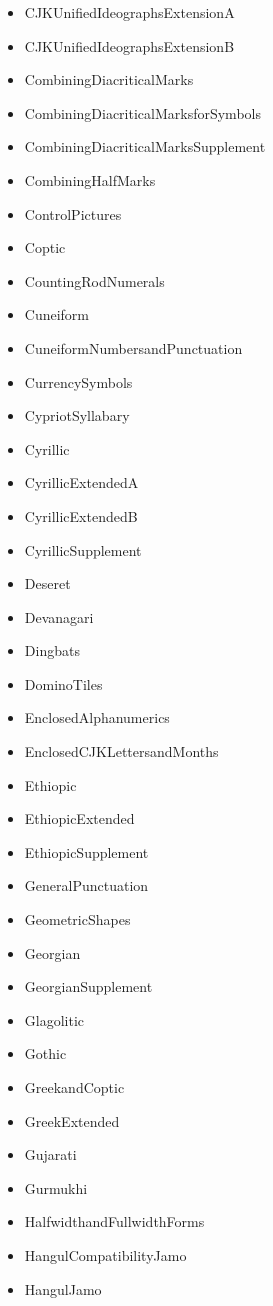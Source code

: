 \documentclass{article}
\newenvironment{itemlist}{%
  \begin{itemize}
	\setlength{\itemsep}{0pt}
	\setlength{\parsep}{0pt}
	\setlength{\topsep}{0pt}
	\setlength{\partopsep}{0pt}
	\setlength{\parskip}{0pt}
	\setlength{\labelsep}{5pt}}%
{
  \end{itemize}}
\begin{document}
\begin{multicols}{2}
\begin{itemlist}
				\item CJKUnifiedIdeographsExtensionA
				\item CJKUnifiedIdeographsExtensionB
				\item CombiningDiacriticalMarks
				\item CombiningDiacriticalMarksforSymbols
				\item CombiningDiacriticalMarksSupplement
				\item CombiningHalfMarks
				\item ControlPictures
				\item Coptic
				\item CountingRodNumerals
				\item Cuneiform
				\item CuneiformNumbersandPunctuation
				\item CurrencySymbols
				\item CypriotSyllabary
				\item Cyrillic
				\item CyrillicExtendedA
				\item CyrillicExtendedB
				\item CyrillicSupplement
				\item Deseret
				\item Devanagari
				\item Dingbats
				\item DominoTiles
				\item EnclosedAlphanumerics
				\item EnclosedCJKLettersandMonths
				\item Ethiopic
				\item EthiopicExtended
				\item EthiopicSupplement
				\item GeneralPunctuation
				\item GeometricShapes
				\item Georgian
				\item GeorgianSupplement
				\item Glagolitic
				\item Gothic
				\item GreekandCoptic
				\item GreekExtended
				\item Gujarati
				\item Gurmukhi
				\item HalfwidthandFullwidthForms
				\item HangulCompatibilityJamo
				\item HangulJamo

\end{itemlist}
\end{multicols}
\end{document}
